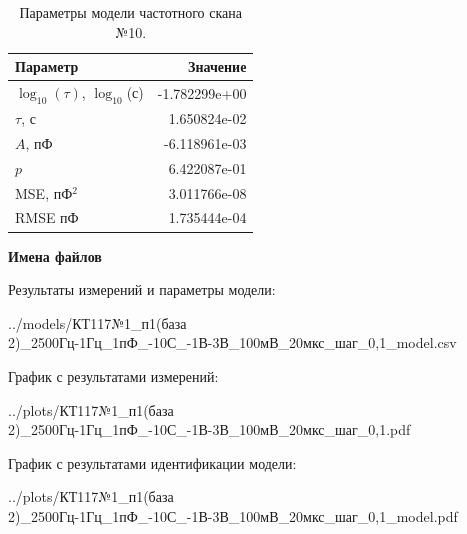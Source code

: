 \begin{table}[!ht]
    \centering
    \caption{Параметры модели частотного скана №10.}
    \begin{tabular}{|l|r|}
        \hline
        Параметр                                       & Значение                  \\ \hline
        $\log_{10}(\tau)$, $\log_{10}$(с)              & -1.782299e+00             \\ \hline
        $\tau$, с                                      & 1.650824e-02              \\ \hline
        $A$, пФ                                        & -6.118961e-03             \\ \hline
        $p$                                            & 6.422087e-01              \\ \hline
        MSE, пФ$^2$                                    & 3.011766e-08              \\ \hline
        RMSE пФ                                        & 1.735444e-04              \\ \hline
    \end{tabular}
    \label{table:frequency_scan_model_10}
\end{table}

\textbf{Имена файлов}

Результаты измерений и параметры модели:

\scriptsize../models/КТ117№1\_п1(база 2)\_2500Гц-1Гц\_1пФ\_-10С\_-1В-3В\_100мВ\_20мкс\_шаг\_0,1\_model.csv
\normalsize

График с результатами измерений:

\scriptsize../plots/КТ117№1\_п1(база 2)\_2500Гц-1Гц\_1пФ\_-10С\_-1В-3В\_100мВ\_20мкс\_шаг\_0,1.pdf
\normalsize

График с результатами идентификации модели:

\scriptsize../plots/КТ117№1\_п1(база 2)\_2500Гц-1Гц\_1пФ\_-10С\_-1В-3В\_100мВ\_20мкс\_шаг\_0,1\_model.pdf
\normalsize

